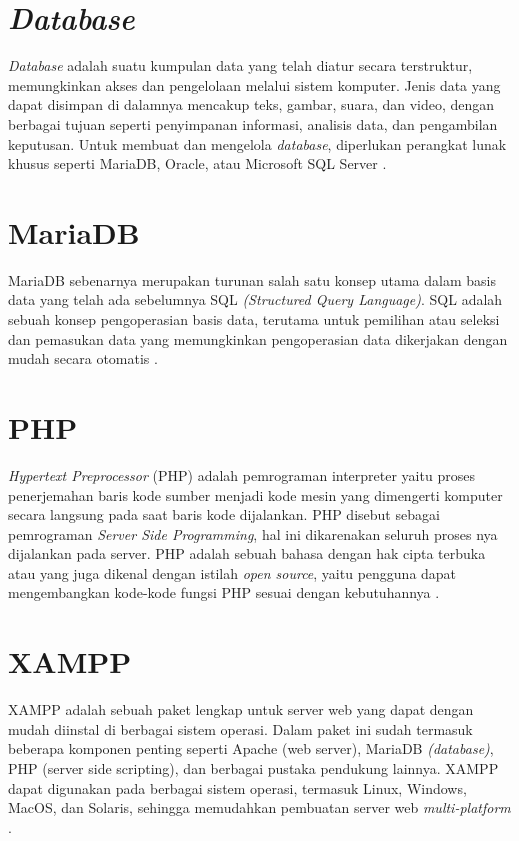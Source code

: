 \section{\textit{Database}}
\textit{Database} adalah suatu kumpulan data yang telah diatur secara terstruktur, memungkinkan akses dan pengelolaan melalui sistem komputer. Jenis data yang dapat disimpan di dalamnya mencakup teks, gambar, suara, dan video, dengan berbagai tujuan seperti penyimpanan informasi, analisis data, dan pengambilan keputusan. Untuk membuat dan mengelola \textit{database}, diperlukan perangkat lunak khusus seperti MariaDB, Oracle, atau Microsoft SQL Server \cite{Cowls2021ADB}.
\section{MariaDB}
MariaDB sebenarnya merupakan turunan salah satu konsep utama dalam basis data yang telah ada sebelumnya SQL \textit{(Structured Query Language)}. SQL adalah sebuah konsep pengoperasian basis data, terutama untuk pemilihan atau seleksi dan pemasukan data yang memungkinkan pengoperasian data dikerjakan dengan mudah secara otomatis \cite{priyanti2013sistem}.
\section{PHP}
\textit{Hypertext Preprocessor} (PHP) adalah pemrograman interpreter yaitu proses penerjemahan baris kode sumber menjadi kode mesin yang dimengerti komputer secara langsung pada saat baris kode dijalankan. PHP disebut sebagai pemrograman \textit{Server Side Programming}, hal ini dikarenakan seluruh proses nya dijalankan pada server. PHP adalah sebuah bahasa dengan hak cipta terbuka atau yang juga dikenal dengan istilah \textit{open source}, yaitu pengguna dapat mengembangkan kode-kode fungsi PHP sesuai dengan kebutuhannya \cite{php2001php}.
\section{XAMPP}
XAMPP adalah sebuah paket lengkap untuk server web yang dapat dengan mudah diinstal di berbagai sistem operasi. Dalam paket ini sudah termasuk beberapa komponen penting seperti Apache (web server), MariaDB \textit{(database)}, PHP (server side scripting), dan berbagai pustaka pendukung lainnya. XAMPP dapat digunakan pada berbagai sistem operasi, termasuk Linux, Windows, MacOS, dan Solaris, sehingga memudahkan pembuatan server web \textit{multi-platform} \cite{pakpahan2020sistem}.
